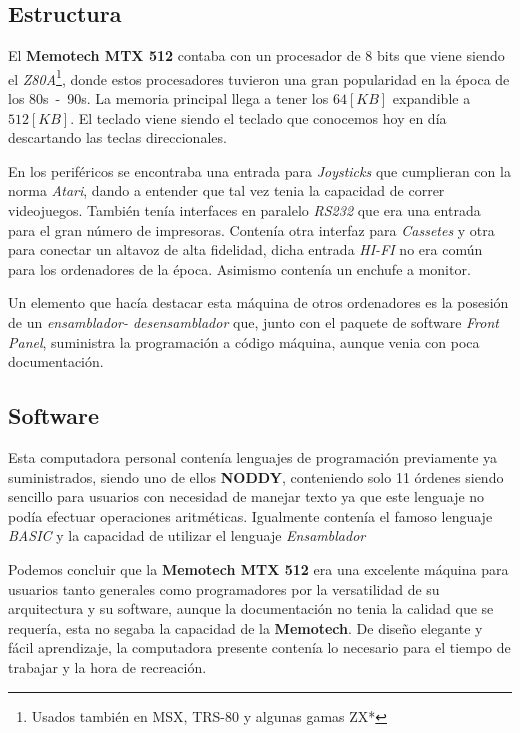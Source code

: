 \documentclass{article}
\begin{document}
\subsection{Estructura}

El \textbf{Memotech MTX 512} contaba con un procesador de 8 bits que viene siendo el
\textit{Z80A}\footnote{Usados también en MSX, TRS-80 y algunas gamas ZX*}, donde estos procesadores
tuvieron una gran popularidad en la época de los 80s\ -\ 90s. La memoria principal llega a tener los $64 [KB]$
expandible a $512 [KB]$. El teclado viene siendo el teclado que conocemos hoy en día descartando las teclas
direccionales.

En los periféricos se encontraba una entrada para \textit{Joysticks} que cumplieran con la norma
\textit{Atari}, dando a entender que tal vez tenia la capacidad de correr videojuegos. También tenía interfaces
en paralelo \textit{RS232} que era una entrada para el gran número de impresoras.
Contenía otra interfaz para \textit{Cassetes} y otra para conectar un altavoz de alta fidelidad,
dicha entrada \textit{HI-FI} no era común para los ordenadores de la época. Asimismo contenía un enchufe
a monitor.

Un elemento que hacía destacar esta máquina de otros ordenadores es la posesión de un \textit{ensamblador-
  desensamblador}\label{asm} que, junto con el paquete de software \textit{Front Panel}, suministra la programación a
código máquina, aunque venia con poca documentación.

\subsection{Software}

Esta computadora personal contenía lenguajes de programación previamente ya suministrados, siendo uno de
ellos \textbf{NODDY}, conteniendo solo 11 órdenes siendo sencillo para usuarios con necesidad de manejar texto
ya que este lenguaje no podía efectuar operaciones aritméticas. Igualmente contenía el famoso lenguaje
\textit{BASIC} y la capacidad de utilizar el lenguaje \textit{Ensamblador}\label{asm}

Podemos concluir que la \textbf{Memotech MTX 512} era una excelente máquina para usuarios tanto generales como
programadores por la versatilidad de su arquitectura y su software, aunque la documentación no tenia la
calidad que se requería, esta no segaba la capacidad de la \textbf{Memotech}. De diseño elegante y fácil
aprendizaje, la computadora presente contenía lo necesario para el tiempo de trabajar y la hora de recreación.
\end{document}
